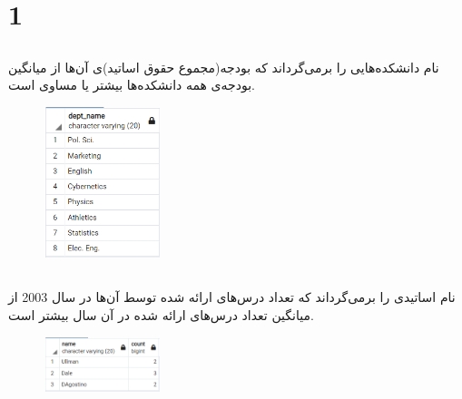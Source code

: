 \documentclass{article}
\begin{document}


\newpage


\section{1}
\subsection{}
نام دانشکده‌هایی را برمی‌گرداند که بودجه(مجموع حقوق اساتید)ی آن‌ها از میانگین بودجه‌ی همه دانشکده‌ها بیشتر یا مساوی است.
\begin{figure}[ht]
    \centering
    \includegraphics[width=0.3\textwidth]{figures/1-a.png}
    \caption
	{
	}
    \label{fig:fig1}
\end{figure}

\subsection{}
نام اساتیدی را بر‌می‌گرداند که تعداد درس‌های ارائه شده توسط آن‌ها در سال 2003 از میانگین تعداد درس‌های ارائه شده در آن سال بیشتر است.
\begin{figure}[ht]
    \centering
    \includegraphics[width=0.3\textwidth]{figures/1-b.png}
    \caption
	{
	}
    \label{fig:fig1}
\end{figure}

\end{document}
